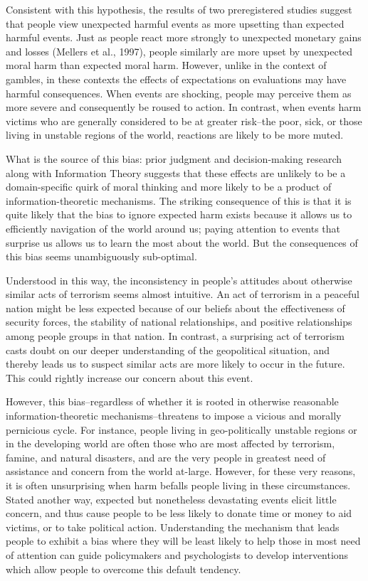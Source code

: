 \documentclass[12pt,]{article}
\begin{document}
Consistent with this hypothesis, the results of two preregistered
studies suggest that people view unexpected harmful events as more
upsetting than expected harmful events. Just as people react more
strongly to unexpected monetary gains and losses (Mellers et al., 1997),
people similarly are more upset by unexpected moral harm than expected
moral harm. However, unlike in the context of gambles, in these contexts
the effects of expectations on evaluations may have harmful
consequences. When events are shocking, people may perceive them as more
severe and consequently be roused to action. In contrast, when events
harm victims who are generally considered to be at greater risk--the
poor, sick, or those living in unstable regions of the world, reactions
are likely to be more muted.

What is the source of this bias: prior judgment and decision-making
research along with Information Theory suggests that these effects are
unlikely to be a domain-specific quirk of moral thinking and more likely
to be a product of information-theoretic mechanisms. The striking
consequence of this is that it is quite likely that the bias to ignore
expected harm exists because it allows us to efficiently navigation of
the world around us; paying attention to events that surprise us allows
us to learn the most about the world. But the consequences of this bias
seems unambiguously sub-optimal.

Understood in this way, the inconsistency in people's attitudes about
otherwise similar acts of terrorism seems almost intuitive. An act of
terrorism in a peaceful nation might be less expected because of our
beliefs about the effectiveness of security forces, the stability of
national relationships, and positive relationships among people groups
in that nation. In contrast, a surprising act of terrorism casts doubt
on our deeper understanding of the geopolitical situation, and thereby
leads us to suspect similar acts are more likely to occur in the future.
This could rightly increase our concern about this event.

However, this bias--regardless of whether it is rooted in otherwise
reasonable information-theoretic mechanisms--threatens to impose a
vicious and morally pernicious cycle. For instance, people living in
geo-politically unstable regions or in the developing world are often
those who are most affected by terrorism, famine, and natural disasters,
and are the very people in greatest need of assistance and concern from
the world at-large. However, for these very reasons, it is often
unsurprising when harm befalls people living in these circumstances.
Stated another way, expected but nonetheless devastating events elicit
little concern, and thus cause people to be less likely to donate time
or money to aid victims, or to take political action. Understanding the
mechanism that leads people to exhibit a bias where they will be least
likely to help those in most need of attention can guide policymakers
and psychologists to develop interventions which allow people to
overcome this default tendency.
\end{document}
